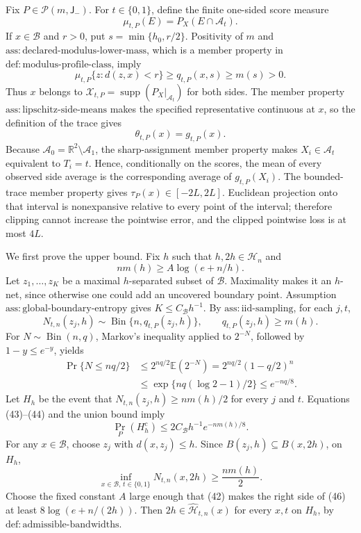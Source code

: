 Fix \(P\in\mathcal P(m,\mathsf J_{-})\).  For \(t\in\{0,1\}\), define the finite one-sided score measure
\[
 \mu_{t,P}(E)=P_X(E\cap\mathcal A_t).
\]
If \(x\in\mathcal B\) and \(r>0\), put \(s=\min\{h_0,r/2\}\).  Positivity of \(m\) and \(\mathrm{ass:declared\text{-}modulus\text{-}lower\text{-}mass}\), which is a member property in \(\mathrm{def:modulus\text{-}profile\text{-}class}\), imply
\[
 \mu_{t,P}\{z:d(z,x)<r\}
 \ge q_{t,P}(x,s)
 \ge m(s)>0. \tag{40}
\]
Thus \(x\) belongs to \(\mathcal X_{t,P}=\operatorname{supp}(P_X|_{\mathcal A_t})\) for both sides.  The member property \(\mathrm{ass:lipschitz\text{-}side\text{-}means}\) makes the specified representative continuous at \(x\), so the definition of the trace gives
\[
 \theta_{t,P}(x)=g_{t,P}(x). \tag{41}
\]
Because \(\mathcal A_0=\mathbb R^2\setminus\mathcal A_1\), the sharp-assignment member property makes \(X_i\in\mathcal A_t\) equivalent to \(T_i=t\).  Hence, conditionally on the scores, the mean of every observed side average is the corresponding average of \(g_{t,P}(X_i)\).  The bounded-trace member property gives \(\tau_P(x)\in[-2L,2L]\).  Euclidean projection onto that interval is nonexpansive relative to every point of the interval; therefore clipping cannot increase the pointwise error, and the clipped pointwise loss is at most \(4L\).

We first prove the upper bound.  Fix \(h\) such that \(h,2h\in\mathcal H_n\) and
\[
 nm(h)\ge A\log(e+n/h). \tag{42}
\]
Let \(z_1,\ldots,z_K\) be a maximal \(h\)-separated subset of \(\mathcal B\).  Maximality makes it an \(h\)-net, since otherwise one could add an uncovered boundary point.  Assumption \(\mathrm{ass:global\text{-}boundary\text{-}entropy}\) gives \(K\le C_{\mathcal B}h^{-1}\).  By \(\mathrm{ass:iid\text{-}sampling}\), for each \(j,t\),
\[
 N_{t,n}(z_j,h)\sim\operatorname{Bin}\{n,q_{t,P}(z_j,h)\},
 \qquad q_{t,P}(z_j,h)\ge m(h). \tag{43}
\]
For \(N\sim\operatorname{Bin}(n,q)\), Markov's inequality applied to \(2^{-N}\), followed by \(1-y\le e^{-y}\), yields
\[
 \begin{aligned}
 \Pr\{N\le nq/2\}
 &\le 2^{nq/2}\mathbb E(2^{-N})
 =2^{nq/2}(1-q/2)^n\\
 &\le\exp\{nq(\log 2-1)/2\}
 \le e^{-nq/8}. 
 \end{aligned} \tag{44}
\]
Let \(H_h\) be the event that \(N_{t,n}(z_j,h)\ge nm(h)/2\) for every \(j\) and \(t\).  Equations (43)--(44) and the union bound imply
\[
 \Pr_P(H_h^c)\le2C_{\mathcal B}h^{-1}e^{-nm(h)/8}. \tag{45}
\]
For any \(x\in\mathcal B\), choose \(z_j\) with \(d(x,z_j)\le h\).  Since \(B(z_j,h)\subseteq B(x,2h)\), on \(H_h\),
\[
 \inf_{x\in\mathcal B,\,t\in\{0,1\}}N_{t,n}(x,2h)
 \ge\frac{nm(h)}2. \tag{46}
\]
Choose the fixed constant \(A\) large enough that (42) makes the right side of (46) at least \(8\log(e+n/(2h))\).  Then \(2h\in\widehat{\mathcal H}_{t,n}(x)\) for every \(x,t\) on \(H_h\), by \(\mathrm{def:admissible\text{-}bandwidths}\).

